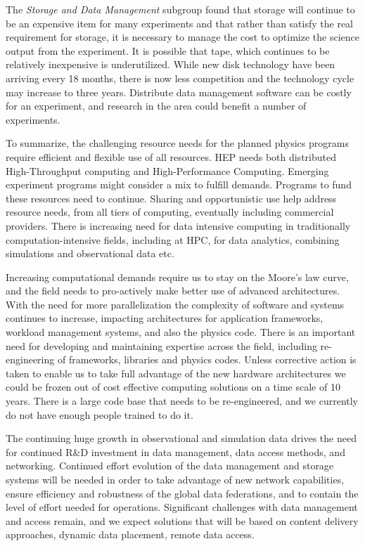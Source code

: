 The {\it Storage and Data Management} subgroup found that storage will continue to be an expensive item for many experiments and that rather than satisfy the real requirement for storage, it is necessary to manage the cost to optimize the science output from the experiment.  It is possible that tape, which continues to be relatively inexpensive is underutilized.  While new disk technology have been arriving every 18 months, there is now less competition and the technology cycle may increase to three years.  Distribute data management software can be costly for an experiment, and research in the area could benefit a number of experiments.

To summarize, the challenging resource needs for the planned physics programs require efficient and flexible use of all resources. HEP needs both distributed High-Throughput computing and High-Performance Computing. Emerging experiment programs might consider a mix to fulfill demands. Programs to fund these resources need to continue. Sharing and opportunistic use help address resource needs, from all tiers of computing, eventually including commercial providers. There is increasing need for data intensive computing in traditionally computation-intensive fields, including at HPC, for data analytics, combining simulations and observational data etc. 

Increasing computational demands require us to stay on the Moore’s law curve, and the field needs to pro-actively make better use of advanced architectures. With the need for more parallelization the complexity of software and systems continues to increase, impacting architectures for application frameworks, workload management systems, and also the physics code. There is an important need for developing and maintaining expertise across the field, including re-engineering of frameworks, libraries and physics codes. Unless corrective action is taken to enable us to take full advantage of the new hardware architectures we could be frozen out of cost effective computing solutions on a time scale of 10 years. There is a large code base that needs to be re-engineered, and we currently do not have enough people trained to do it.

The continuing huge growth in observational and simulation data drives the need for continued R\&D investment in data management, data access methods, and networking.  Continued effort evolution of the data management and storage systems will be needed in order to take advantage of new network capabilities, ensure efficiency and robustness of the global data federations, and to contain the level of effort needed for operations. Significant challenges with data management and access remain, and we expect solutions that will be based on content delivery approaches, dynamic data placement, remote data access. 

